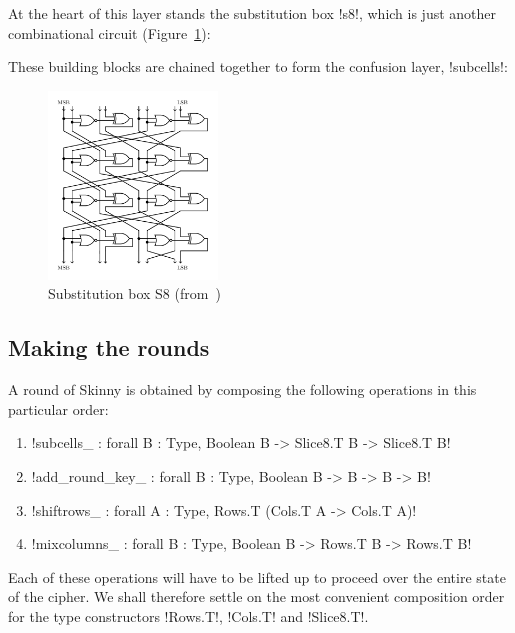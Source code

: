 \documentclass[draft,english]{jflart}
\begin{document}

At the heart of this layer stands the substitution box \coqe!s8!,
which is just another combinational circuit (Figure~\ref{fig:s8}):
%

These building blocks are chained together to form the confusion
layer, \coqe!subcells!:
%

\begin{figure}
  \centering
  \includegraphics[draft=false,height=5cm]{s8}
  \caption{Substitution box S8 (from~\citet{skinny-spec})}
  \label{fig:s8}
\end{figure}

\subsection{Making the rounds}
\label{sec:assembling}


A round of Skinny is obtained by composing the following operations in
this particular order:
%
\begin{enumerate}
\item \coqe!subcells_ : forall {B : Type}, Boolean B -> Slice8.T B -> Slice8.T B!
\item \coqe!add_round_key_ : forall {B : Type}, Boolean B -> B -> B -> B!
\item \coqe!shiftrows_ : forall {A : Type}, Rows.T (Cols.T A -> Cols.T A)!
\item \coqe!mixcolumns_ : forall {B : Type}, Boolean B -> Rows.T B -> Rows.T B!
\end{enumerate}

Each of these operations will have to be lifted up to proceed over the
entire state of the cipher. We shall therefore settle on the most
convenient composition order for the type constructors \coqe!Rows.T!,
\coqe!Cols.T! and \coqe!Slice8.T!.
\end{document}
